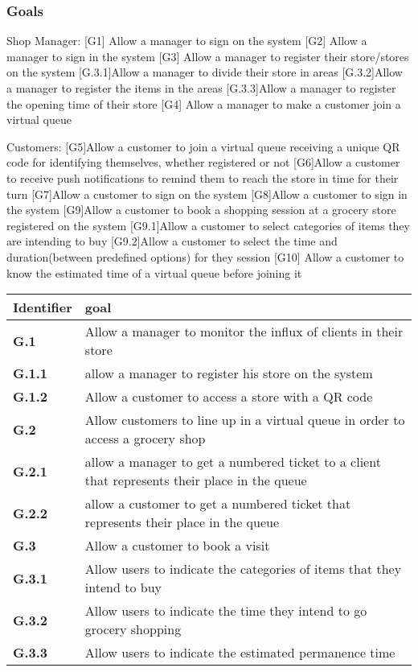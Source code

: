 \subsubsection{Goals}
\label{subsect:goals}

Shop Manager:
[G1] Allow a manager to sign on the system
[G2] Allow a manager to sign in the system
[G3] Allow a manager to register their store/stores on the system
	[G.3.1]Allow a manager to divide their store in areas	
	[G.3.2]Allow a manager to register the items in the areas
	[G.3.3]Allow a manager to register the opening time of their 
		store
[G4] Allow a manager to make a customer join a virtual queue

Customers:
[G5]Allow a customer to join a virtual queue receiving a unique QR code for identifying themselves, whether registered or not
[G6]Allow a customer to receive push notifications to remind them to reach the store in time for their turn
[G7]Allow a customer to sign on the system
[G8]Allow a customer to sign in the system
[G9]Allow a customer to book a shopping session at a grocery store registered on the system
	[G9.1]Allow a customer to select categories of items they are 		intending to 
	buy
	[G9.2]Allow a customer to select the time and duration(between 		predefined options) for they session 	
[G10] Allow a customer to know the estimated time of a virtual queue before		joining it




\begin{tabular}{|l|l|}
    \hline
    \textbf{Identifier} & \textbf{goal}\\
    \hline
    \textbf{G.1} & Allow a manager to monitor the influx of clients in their store\\
    \textbf{G.1.1} & allow a manager to register his store on the system\\
    \textbf{G.1.2} & Allow a customer to access a store with a QR code\\
    \hline
    \textbf{G.2} & Allow customers to line up in a virtual queue in order to access a grocery shop\\
    \textbf{G.2.1} & allow a manager to get a numbered ticket to a client that represents their place in the queue\\
    \textbf{G.2.2} & allow a customer to get a numbered ticket that represents their place in the queue\\
    \hline
    \textbf{G.3} & Allow a customer to book a visit\\
    \textbf{G.3.1} & Allow users to indicate the categories of items that they intend to buy\\
    \textbf{G.3.2} & Allow users to indicate the time they intend to go grocery shopping\\
    \textbf{G.3.3} & Allow users to indicate the estimated permanence time \\
    \hline
\end{tabular}

